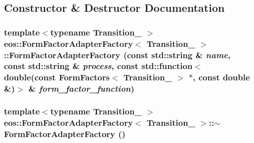 \subsection{Constructor \& Destructor Documentation}
\hypertarget{classeos_1_1FormFactorAdapterFactory_ab337ad383b3c13c698224e400be9f84d}{
\subsubsection[{FormFactorAdapterFactory}]{\setlength{\rightskip}{0pt plus 5cm}template$<$typename Transition\_\- $>$ {\bf eos::FormFactorAdapterFactory}$<$ Transition\_\- $>$::{\bf FormFactorAdapterFactory} (const std::string \& {\em name}, \/  const std::string \& {\em process}, \/  const std::function$<$ double(const FormFactors$<$ Transition\_\- $>$ $\ast$, const double \&)$>$ \& {\em form\_\-factor\_\-function})}}
\label{classeos_1_1FormFactorAdapterFactory_ab337ad383b3c13c698224e400be9f84d}
\hypertarget{classeos_1_1FormFactorAdapterFactory_a6d1b1046b3e7651e0d899dcac8fb8e3c}{
\subsubsection[{$\sim$FormFactorAdapterFactory}]{\setlength{\rightskip}{0pt plus 5cm}template$<$typename Transition\_\- $>$ {\bf eos::FormFactorAdapterFactory}$<$ Transition\_\- $>$::$\sim${\bf FormFactorAdapterFactory} ()}}
\label{classeos_1_1FormFactorAdapterFactory_a6d1b1046b3e7651e0d899dcac8fb8e3c}


